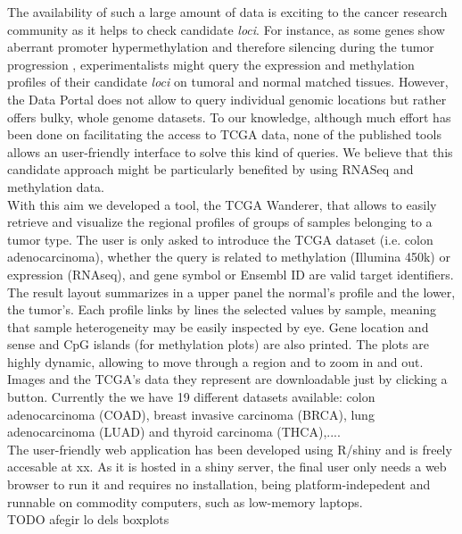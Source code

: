 \documentclass{article}
\begin{document}
The availability of such a large amount of data is exciting to the cancer research community as it helps to check candidate \textit{loci}. For instance, as some genes show aberrant promoter hypermethylation and therefore silencing during the tumor progression \cite{jones2002fundamental}, experimentalists might query the expression and methylation profiles of their candidate \textit{loci} on tumoral and normal matched tissues. However, the Data Portal does not allow to query individual genomic locations but rather offers bulky, whole genome datasets. To our knowledge, although much effort has been done on facilitating the access to TCGA data, none of the published tools allows an user-friendly interface to solve this kind of queries. We believe that this candidate approach might be particularly benefited by using RNASeq and methylation data.\\


With this aim we developed a tool, the TCGA Wanderer, that allows to easily retrieve and visualize the regional profiles of groups of samples belonging to a tumor type. The user is only asked to introduce the TCGA dataset (i.e. colon adenocarcinoma), whether the query is related to methylation (Illumina 450k) or expression (RNAseq), and gene symbol or Ensembl ID are valid target identifiers. The result layout summarizes in a upper panel the normal's profile and the lower, the tumor's. Each profile links by lines the selected values by sample, meaning that sample heterogeneity may be easily inspected by eye. Gene location and sense and CpG islands (for methylation plots) are also printed. The plots are highly dynamic, allowing to move through a region and to zoom in and out. Images and the TCGA's data they represent are downloadable just by clicking a button. Currently the we have 19 different datasets available: colon adenocarcinoma (COAD), breast invasive carcinoma (BRCA), lung adenocarcinoma (LUAD) and thyroid carcinoma (THCA),....  \\


The user-friendly web application has been developed using R/shiny and is freely accesable at xx. As it is hosted in a shiny server, the final user only needs a web browser to run it and requires no installation, being platform-indepedent and runnable on commodity computers, such as low-memory laptops.\\


TODO afegir lo dels boxplots
\end{document}
